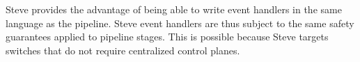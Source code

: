 Steve provides the advantage of being able to write event handlers
in the same language as the pipeline. 
Steve event handlers are thus subject to the same safety
guarantees applied to pipeline stages.
This is possible because Steve targets switches that do not require
centralized control planes.

%


